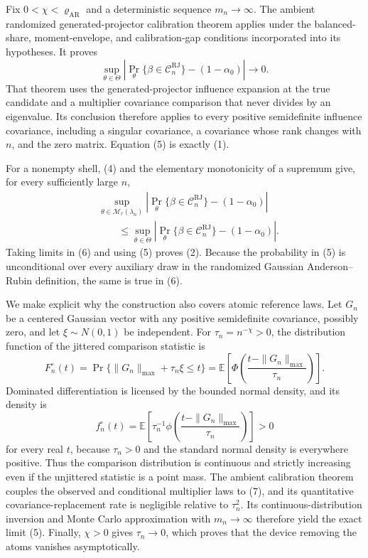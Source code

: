 Fix \(0<\chi<\varrho_{\mathrm{AR}}\) and a deterministic sequence \(m_n\to\infty\).  The ambient randomized generated-projector calibration theorem applies under the balanced-share, moment-envelope, and calibration-gap conditions incorporated into its hypotheses.  It proves
\[
 \sup_{\theta\in\Theta}
 \left|
 \Pr_\theta\{\beta\in\mathcal C_n^{\mathrm{RJ}}\}
 -(1-\alpha_0)
 \right|\longrightarrow0.                                    \tag{5}
\]
That theorem uses the generated-projector influence expansion at the true candidate and a multiplier covariance comparison that never divides by an eigenvalue.  Its conclusion therefore applies to every positive semidefinite influence covariance, including a singular covariance, a covariance whose rank changes with \(n\), and the zero matrix.  Equation (5) is exactly (1).

For a nonempty shell, (4) and the elementary monotonicity of a supremum give, for every sufficiently large \(n\),
\[
 \begin{aligned}
 &\sup_{\theta\in\mathcal M_r(\lambda_n)}
 \left|
 \Pr_\theta\{\beta\in\mathcal C_n^{\mathrm{RJ}}\}
 -(1-\alpha_0)
 \right| \\
 &\qquad\leq
 \sup_{\theta\in\Theta}
 \left|
 \Pr_\theta\{\beta\in\mathcal C_n^{\mathrm{RJ}}\}
 -(1-\alpha_0)
 \right|.
                                                               \tag{6}
 \end{aligned}
\]
Taking limits in (6) and using (5) proves (2).  Because the probability in (5) is unconditional over every auxiliary draw in the randomized Gaussian Anderson--Rubin definition, the same is true in (6).

We make explicit why the construction also covers atomic reference laws.  Let \(G_n\) be a centered Gaussian vector with any positive semidefinite covariance, possibly zero, and let \(\xi\sim N(0,1)\) be independent.  For \(\tau_n=n^{-\chi}>0\), the distribution function of the jittered comparison statistic is
\[
 F_n^{\circ}(t)
 =\Pr\{\|G_n\|_{\max}+\tau_n\xi\leq t\}
 =\mathbb E\!\left[
   \Phi\!\left(\frac{t-\|G_n\|_{\max}}{\tau_n}\right)
  \right].                                                    \tag{7}
\]
Dominated differentiation is licensed by the bounded normal density, and its density is
\[
 f_n^{\circ}(t)
 =\mathbb E\!\left[
   \tau_n^{-1}\phi\!\left(
    \frac{t-\|G_n\|_{\max}}{\tau_n}
   \right)
  \right]>0                                                   \tag{8}
\]
for every real \(t\), because \(\tau_n>0\) and the standard normal density is everywhere positive.  Thus the comparison distribution is continuous and strictly increasing even if the unjittered statistic is a point mass.  The ambient calibration theorem couples the observed and conditional multiplier laws to (7), and its quantitative covariance-replacement rate is negligible relative to \(\tau_n^2\).  Its continuous-distribution inversion and Monte Carlo approximation with \(m_n\to\infty\) therefore yield the exact limit (5).  Finally, \(\chi>0\) gives \(\tau_n\to0\), which proves that the device removing the atoms vanishes asymptotically.

